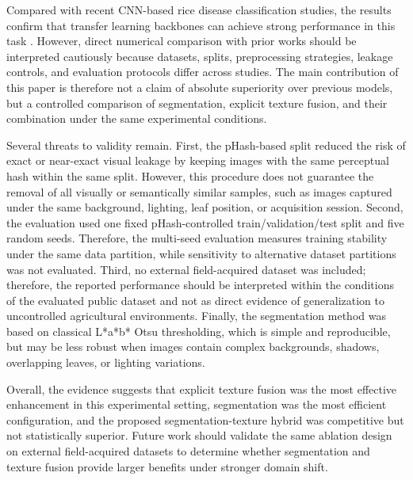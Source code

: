 Compared with recent CNN-based rice disease classification studies, the results confirm that transfer learning backbones can achieve strong performance in this task \cite{ismail2026densenet}. However, direct numerical comparison with prior works should be interpreted cautiously because datasets, splits, preprocessing strategies, leakage controls, and evaluation protocols differ across studies. The main contribution of this paper is therefore not a claim of absolute superiority over previous models, but a controlled comparison of segmentation, explicit texture fusion, and their combination under the same experimental conditions.

Several threats to validity remain. First, the pHash-based split reduced the risk of exact or near-exact visual leakage by keeping images with the same perceptual hash within the same split. However, this procedure does not guarantee the removal of all visually or semantically similar samples, such as images captured under the same background, lighting, leaf position, or acquisition session. Second, the evaluation used one fixed pHash-controlled train/validation/test split and five random seeds. Therefore, the multi-seed evaluation measures training stability under the same data partition, while sensitivity to alternative dataset partitions was not evaluated. Third, no external field-acquired dataset was included; therefore, the reported performance should be interpreted within the conditions of the evaluated public dataset and not as direct evidence of generalization to uncontrolled agricultural environments. Finally, the segmentation method was based on classical L*a*b* Otsu thresholding, which is simple and reproducible, but may be less robust when images contain complex backgrounds, shadows, overlapping leaves, or lighting variations.

Overall, the evidence suggests that explicit texture fusion was the most effective enhancement in this experimental setting, segmentation was the most efficient configuration, and the proposed segmentation-texture hybrid was competitive but not statistically superior. Future work should validate the same ablation design on external field-acquired datasets to determine whether segmentation and texture fusion provide larger benefits under stronger domain shift.
